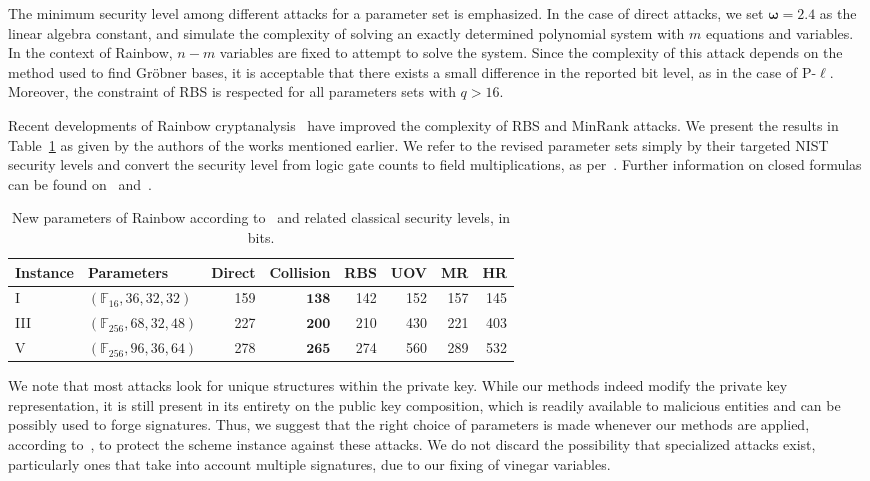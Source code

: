 \documentclass[english]{ufsc-thesis-rn46-2019/ufsc-thesis-rn46-2019}
\theoremstyle{definition}
\begin{document}
The minimum security level among different attacks for a parameter set is
emphasized. In the case of direct attacks, we set $\bm{\omega} = 2.4$ as the
linear algebra constant, and simulate the complexity of solving an exactly
determined polynomial system with $m$ equations and variables. In the context
of Rainbow, $n - m$ variables are fixed to attempt to solve the system. Since
the complexity of this attack depends on the method used to find Gröbner bases,
it is acceptable that there exists a small difference in the reported bit
level, as in the case of P-$\ell$. Moreover, the constraint of RBS is respected
for all parameters sets with $q > 16$.

Recent developments of Rainbow cryptanalysis~\cite{Ding:202006} have improved
the complexity of RBS and MinRank attacks. We present the results in
Table~\ref{tab:newsec} as given by the authors of the works mentioned
earlier. We refer to the revised parameter sets simply by their targeted NIST
security levels and convert the security level from logic gate counts to field
multiplications, as per~\cite[p.~35]{Ding:201901}. Further information on
closed formulas can be found on~\cite[Eq.~19]{Nakamura:202006}
and~\cite[Sec.~5]{Nakamura:202007}.

\begin{table}[htbp]
  \centering
  \renewcommand{\arraystretch}{1.2}
  \caption{New parameters of Rainbow according to~\cite[Sec.~4]{Ding:202006} and
    related classical security levels, in bits.}\label{tab:newsec}
  \begin{tabular}{*{2}{l}*{6}{r}}
    \toprule
    Instance & Parameters                       & Direct & Collision
      & RBS & UOV & MR  & HR  \\
    \midrule
    I        & $(\mathbb{F}_{ 16}, 36, 32, 32)$ & 159    & $\mathbf{ 138}$
      & 142 & 152 & 157 & 145 \\
    III      & $(\mathbb{F}_{256}, 68, 32, 48)$ & 227    & $\mathbf{ 200}$
      & 210 & 430 & 221 & 403 \\
    V        & $(\mathbb{F}_{256}, 96, 36, 64)$ & 278    & $\mathbf{ 265}$
      & 274 & 560 & 289 & 532 \\
    \bottomrule
  \end{tabular}
\end{table}

We note that most attacks look for unique structures within the private
key. While our methods indeed modify the private key representation, it is
still present in its entirety on the public key composition, which is readily
available to malicious entities and can be possibly used to forge
signatures. Thus, we suggest that the right choice of parameters is made
whenever our methods are applied, according to~\cite{Petzoldt:201005}, to
protect the scheme instance against these attacks. We do not discard the
possibility that specialized attacks exist, particularly ones that take into
account multiple signatures, due to our fixing of vinegar variables.
\end{document}
